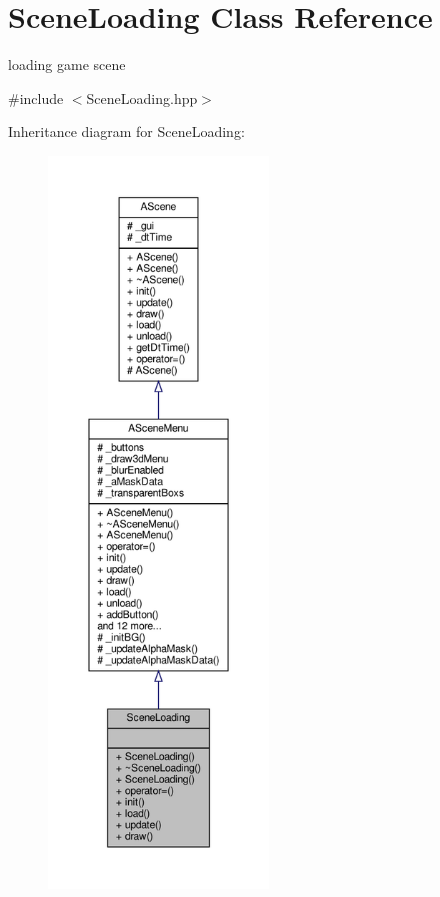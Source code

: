 \hypertarget{class_scene_loading}{}\section{Scene\+Loading Class Reference}
\label{class_scene_loading}


loading game scene  




{\ttfamily \#include $<$Scene\+Loading.\+hpp$>$}



Inheritance diagram for Scene\+Loading\+:
\nopagebreak
\begin{figure}[H]
\begin{center}
\leavevmode
\includegraphics[height=550pt]{class_scene_loading__inherit__graph}
\end{center}
\end{figure}


